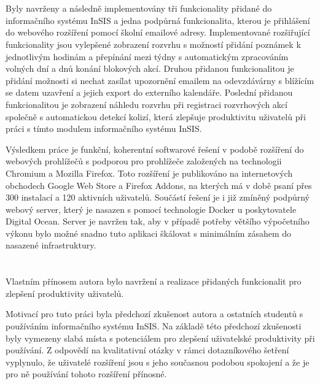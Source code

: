\section*{\Vysledky}

Byly navrženy a následně implementovány tři funkcionality přidané do informačního systému InSIS a jedna podpůrná funkcionalita, kterou je přihlášení do webového rozšíření pomocí školní emailové adresy.  Implementované rozšiřující funkcionality jsou vylepšené zobrazení rozvrhu s možností přidání poznámek k jednotlivým hodinám a přepínání mezi týdny s automatickým zpracováním volných dní a dnů konání blokových akcí. Druhou přidanou funkcionalitou je přidání možnosti si nechat zasílat upozornění emailem na odevzdávárny s blížícím se datem uzavření a jejich export do externího kalendáře. Poslední přidanou funkcionalitou je zobrazení náhledu rozvrhu při registraci rozvrhových akcí společně s automatickou detekcí kolizí, která zlepšuje produktivitu uživatelů při práci s tímto modulem informačního systému InSIS.

Výsledkem práce je funkční, koherentní softwarové řešení v podobě rozšíření do webových prohlížečů s podporou pro prohlížeče založených na technologii Chromium a Mozilla Firefox. Toto rozšíření je publikováno na internetových obchodech Google Web Store a Firefox Addons, na kterých má v době psaní přes 300 instalací a 120 aktivních uživatelů. Součástí řešení je i již zmíněný podpůrný webový server, který je nasazen s pomocí technologie Docker u poskytovatele Digital Ocean. Server je navržen tak, aby v případě potřeby většího výpočetního výkonu bylo možné snadno tuto aplikaci škálovat s minimálním zásahem do nasazené infrastruktury.

\section*{\PrinosAutora}

Vlastním přínosem autora bylo navržení a realizace přidaných funkcionalit pro zlepšení produktivity uživatelů.

Motivací pro tuto práci byla předchozí zkušenost autora a ostatních studentů s používáním informačního systému InSIS. Na základě této předchozí zkušenosti byly vymezeny slabá místa s potenciálem pro zlepšení uživatelské produktivity při používání. Z odpovědí na kvalitativní otázky v rámci dotazníkového šetření vyplynulo, že uživatelé rozšíření jsou s jeho současnou podobou spokojení a že je pro ně používání tohoto rozšíření přínosné.




